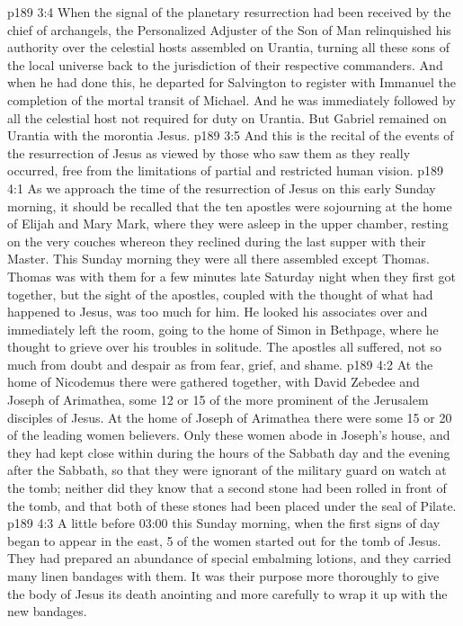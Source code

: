 \vs p189 3:4 \pc When the signal of the planetary resurrection had been received by the chief of archangels, the Personalized Adjuster of the Son of Man relinquished his authority over the celestial hosts assembled on Urantia, turning all these sons of the local universe back to the jurisdiction of their respective commanders. And when he had done this, he departed for Salvington to register with Immanuel the completion of the mortal transit of Michael. And he was immediately followed by all the celestial host not required for duty on Urantia. But Gabriel remained on Urantia with the morontia Jesus.
\vs p189 3:5 \pc And this is the recital of the events of the resurrection of Jesus as viewed by those who saw them as they really occurred, free from the limitations of partial and restricted human vision.
\vs p189 4:1 As we approach the time of the resurrection of Jesus on this early Sunday morning, it should be recalled that the ten apostles were sojourning at the home of Elijah and Mary Mark, where they were asleep in the upper chamber, resting on the very couches whereon they reclined during the last supper with their Master. This Sunday morning they were all there assembled except Thomas. Thomas was with them for a few minutes late Saturday night when they first got together, but the sight of the apostles, coupled with the thought of what had happened to Jesus, was too much for him. He looked his associates over and immediately left the room, going to the home of Simon in Bethpage, where he thought to grieve over his troubles in solitude. The apostles all suffered, not so much from doubt and despair as from fear, grief, and shame.
\vs p189 4:2 \pc At the home of Nicodemus there were gathered together, with David Zebedee and Joseph of Arimathea, some 12 or 15 of the more prominent of the Jerusalem disciples of Jesus. At the home of Joseph of Arimathea there were some 15 or 20 of the leading women believers. Only these women abode in Joseph’s house, and they had kept close within during the hours of the Sabbath day and the evening after the Sabbath, so that they were ignorant of the military guard on watch at the tomb; neither did they know that a second stone had been rolled in front of the tomb, and that both of these stones had been placed under the seal of Pilate.
\vs p189 4:3 A little before 03:00 this Sunday morning, when the first signs of day began to appear in the east, 5 of the women started out for the tomb of Jesus. They had prepared an abundance of special embalming lotions, and they carried many linen bandages with them. It was their purpose more thoroughly to give the body of Jesus its death anointing and more carefully to wrap it up with the new bandages.
